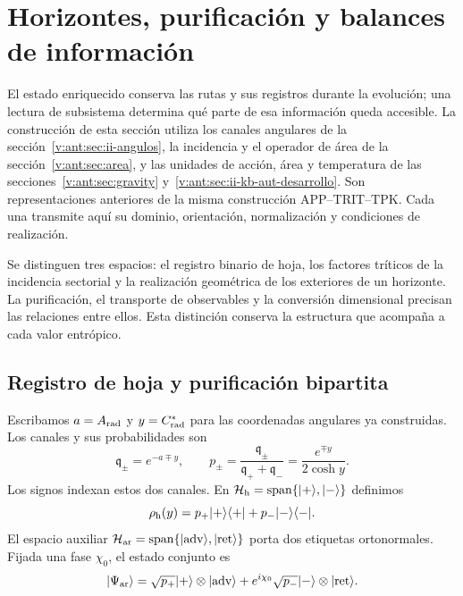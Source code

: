 
\section{Horizontes, purificación y balances de información}
\label{vii:sec:horizontes-informacion}

El estado enriquecido conserva las rutas y sus registros durante la
evolución; una lectura de subsistema determina qué parte de esa información
queda accesible. La construcción de esta sección utiliza los canales
angulares de la sección~\ref{v:ant:sec:ii-angulos}, la incidencia y el
operador de área de la sección~\ref{v:ant:sec:area}, y las unidades
de acción, área y temperatura de las
secciones~\ref{v:ant:sec:gravity}
y~\ref{v:ant:sec:ii-kb-aut-desarrollo}. Son representaciones anteriores de la
misma construcción APP--TRIT--TPK. Cada una transmite aquí su dominio,
orientación, normalización y condiciones de realización.

Se distinguen tres espacios: el registro binario de hoja, los factores
tríticos de la incidencia sectorial y la realización geométrica de los
exteriores de un horizonte. La purificación, el transporte de observables
y la conversión dimensional precisan las relaciones entre ellos. Esta
distinción conserva la estructura que acompaña a cada valor entrópico.

\subsection{Registro de hoja y purificación bipartita}
\label{vii:subsec:hojas-purificacion}

Escribamos \(a=A_{\rm rad}\) y \(y=C^*_{\rm rad}\) para las
coordenadas angulares ya construidas. Los canales y sus probabilidades son
\begin{equation}
 \mathfrak q_\pm=e^{-a\mp y},\qquad
 p_\pm=\frac{\mathfrak q_\pm}{\mathfrak q_++\mathfrak q_-}
       =\frac{e^{\mp y}}{2\cosh y}.
 \label{vii:eq:probabilidades-hoja}
\end{equation}
Los signos indexan estos dos canales. En
\(\mathcal H_{\rm h}=\operatorname{span}\{|+\rangle,|-\rangle\}\)
definimos
\[
 \rho_{\rm h}(y)=p_+|+\rangle\langle+|+p_-|-\rangle\langle-|.
\]
El espacio auxiliar
\(\mathcal H_{\rm ar}=\operatorname{span}
\{|\mathrm{adv}\rangle,|\mathrm{ret}\rangle\}\)
porta dos etiquetas ortonormales. Fijada una fase \(\chi_0\), el estado
conjunto es
\begin{equation}
 |\Psi_{\rm ar}\rangle
 =\sqrt{p_+}|+\rangle\otimes|\mathrm{adv}\rangle
  +e^{i\chi_0}\sqrt{p_-}|-\rangle\otimes|\mathrm{ret}\rangle.
 \label{vii:eq:purificacion-hoja}
\end{equation}

